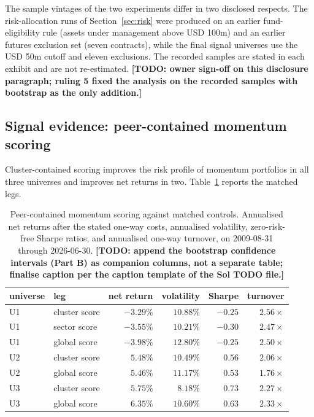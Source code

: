 \documentclass[11pt]{article}
\theoremstyle{remark}
\newcommand{\TODO}[1]{\textbf{[TODO: #1]}}
\begin{document}
The sample vintages of the two experiments differ in two disclosed respects.
The risk-allocation runs of Section~\ref{sec:risk} were produced on an earlier
fund-eligibility rule (assets under management above USD 100m) and an earlier
futures exclusion set (seven contracts), while the final signal universes use
the USD 50m cutoff and eleven exclusions. The recorded samples are stated in
each exhibit and are not re-estimated. \TODO{owner sign-off on this
disclosure paragraph; ruling 5 fixed the analysis on the recorded samples
with bootstrap as the only addition.}

\subsection{Signal evidence: peer-contained momentum scoring}
\label{sec:signal}

Cluster-contained scoring improves the risk profile of momentum portfolios in
all three universes and improves net returns in two. Table~\ref{tab:signal}
reports the matched legs.

\begin{table}[htbp]
\centering
\caption{Peer-contained momentum scoring against matched controls.
Annualised net returns after the stated one-way costs, annualised volatility,
zero-risk-free Sharpe ratios, and annualised one-way turnover, on
2009-08-31 through 2026-06-30.
\TODO{append the bootstrap confidence intervals (Part B) as companion
columns, not a separate table; finalise caption per the caption template of
the Sol TODO file.}}
\label{tab:signal}
\small
\begin{tabular}{llrrrr}
\toprule
universe & leg & net return & volatility & Sharpe & turnover \\
\midrule
U1 & cluster score & $-3.29\%$ & $10.88\%$ & $-0.25$ & $2.56\times$ \\
U1 & sector score & $-3.55\%$ & $10.21\%$ & $-0.30$ & $2.47\times$ \\
U1 & global score & $-3.98\%$ & $12.80\%$ & $-0.25$ & $2.50\times$ \\
\midrule
U2 & cluster score & $5.48\%$ & $10.49\%$ & $0.56$ & $2.06\times$ \\
U2 & global score & $5.46\%$ & $11.17\%$ & $0.53$ & $1.76\times$ \\
\midrule
U3 & cluster score & $5.75\%$ & $8.18\%$ & $0.73$ & $2.27\times$ \\
U3 & global score & $6.35\%$ & $10.60\%$ & $0.63$ & $2.33\times$ \\
\bottomrule
\end{tabular}
\end{table}
\end{document}
